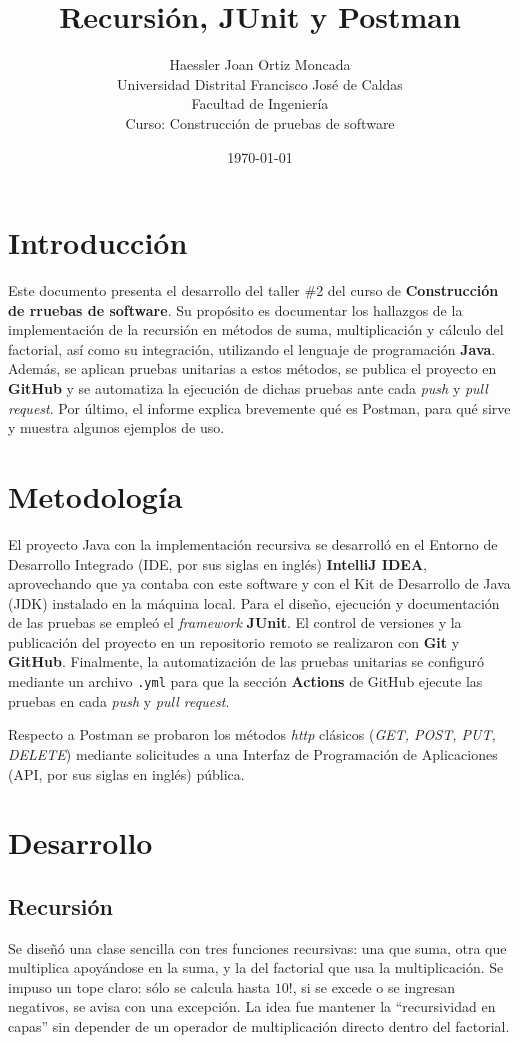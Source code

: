 \documentclass[12pt,a4paper]{article}
\title{\textbf{Recursión, JUnit y Postman}}
\author{Haessler Joan Ortiz Moncada \\[0.5cm]
        Universidad Distrital Francisco José de Caldas \\
        Facultad de Ingeniería \\
        Curso: Construcción de pruebas de software}
\date{\today}
\begin{document}
\maketitle

\section{Introducción}
Este documento presenta el desarrollo del taller \#2 del curso de \textbf{Construcción de rruebas de software}. 
Su propósito es documentar los hallazgos de la implementación de la recursión en métodos de suma, 
multiplicación y cálculo del factorial, así como su integración, utilizando el lenguaje de programación 
\textbf{Java}. Además, se aplican pruebas unitarias a estos métodos, se publica el proyecto en \textbf{GitHub} 
y se automatiza la ejecución de dichas pruebas ante cada \textit{push} y \textit{pull request}. Por último, 
el informe explica brevemente qué es Postman, para qué sirve y muestra algunos ejemplos de uso.

\section{Metodología}
El proyecto Java con la implementación recursiva se desarrolló en el Entorno de Desarrollo Integrado 
(IDE, por sus siglas en inglés) \textbf{IntelliJ IDEA}, aprovechando que ya contaba con este software y con 
el Kit de Desarrollo de Java (JDK) instalado en la máquina local. Para el diseño, ejecución y documentación 
de las pruebas se empleó el \textit{framework} \textbf{JUnit}. El control de versiones y la publicación del 
proyecto en un repositorio remoto se realizaron con \textbf{Git} y \textbf{GitHub}. Finalmente, la automatización 
de las pruebas unitarias se configuró mediante un archivo \texttt{.yml} para que la sección \textbf{Actions} de 
GitHub ejecute las pruebas en cada \textit{push} y \textit{pull request}.

Respecto a Postman se probaron los métodos \textit{http} clásicos (\textit{GET, POST, PUT, DELETE}) mediante 
solicitudes a una Interfaz de Programación de Aplicaciones (API, por sus siglas en inglés) pública.

\section{Desarrollo}

\subsection{Recursión}
Se diseñó una clase sencilla con tres funciones recursivas: una que suma, otra que multiplica apoyándose en la 
suma, y la del factorial que usa la multiplicación. Se impuso un tope claro: sólo se calcula hasta \(10!\), si se 
excede o se ingresan negativos, se avisa con una excepción. La idea fue mantener la ``recursividad en capas'' 
sin depender de un operador de multiplicación directo dentro del factorial.
\end{document}
